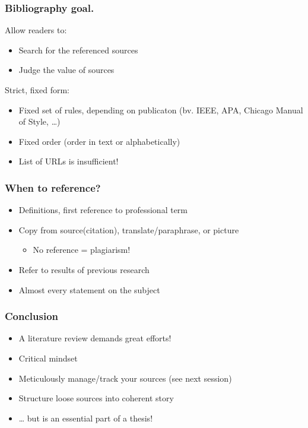 \documentclass[aspectratio=169]{beamer}
\begin{document}
\begin{frame}[plain]
    \frametitle{Bibliography goal.}

    Allow readers to:

    \begin{itemize}
        \item Search for the referenced sources
        \item Judge the value of sources
    \end{itemize}

    {\pause}

    Strict, fixed form:

    \begin{itemize}
        \item Fixed set of rules, depending on publicaton (bv. IEEE, APA, Chicago Manual of Style, \ldots)
        \item Fixed order (order in text or alphabetically)
        \item List of URLs is insufficient!
    \end{itemize}

    {\pause}

\end{frame}

\begin{frame}
    \frametitle{When to reference?}

    \begin{itemize}
        \item Definitions, first reference to professional term
        \item Copy from source(citation), translate/paraphrase, or picture
              \begin{itemize}
                  \item No reference = \alert{plagiarism!}
              \end{itemize}
        \item Refer to results of previous research
        \item Almost every statement on the subject
    \end{itemize}

    \bigskip

\end{frame}

\begin{frame}
    \frametitle{Conclusion}

    \begin{itemize}
        \item A literature review demands great efforts!
        \item Critical mindset
        \item Meticulously manage/track your sources (see next session)
        \item Structure loose sources into coherent story
        \item \ldots{} but is an essential part of a thesis!
    \end{itemize}

\end{frame}
\end{document}
